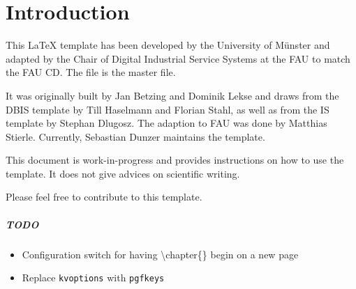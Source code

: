 \chapter{Introduction}
This \LaTeX \- template has been developed by the University of M\"unster and adapted by the Chair of Digital Industrial Service Systems at the \gls{FAU} to match the \gls{FAU} \gls{CD}. The file  is the master file.

It was originally built by  Jan Betzing and Dominik Lekse and draws from the DBIS template by Till Haselmann and Florian Stahl, as well as from the IS template by Stephan Dlugosz. The adaption to FAU was done by Matthias Stierle. Currently, Sebastian Dunzer maintains the template.

This document is work-in-progress and provides instructions on how to use the template. It does not give advices on scientific writing.

Please feel free to contribute to this template.

\paragraph{TODO}
\begin{itemize}
	\item Configuration switch for having \textbackslash chapter\{\} begin on a new page
	\item Replace \texttt{kvoptions} with \texttt{pgfkeys}
\end{itemize}